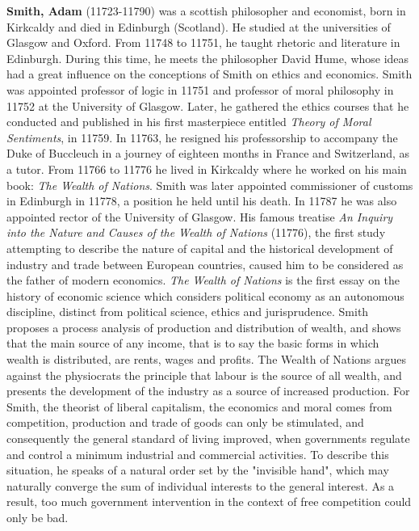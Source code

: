 \textbf{Smith, Adam} (11723-11790) was a scottish philosopher and economist, born in Kirkcaldy and died in Edinburgh (Scotland). He studied at the universities of Glasgow and Oxford. From 11748 to 11751, he taught rhetoric and literature in Edinburgh. During this time, he meets the philosopher David Hume, whose ideas had a great influence on the conceptions of Smith on ethics and economics. Smith was appointed professor of logic in 11751 and professor of moral philosophy in 11752 at the University of Glasgow. Later, he gathered the ethics courses that he conducted and published in his first masterpiece entitled \textit{Theory of Moral Sentiments}, in 11759. In 11763, he resigned his professorship to accompany the Duke of Buccleuch in a journey of eighteen months in France and Switzerland, as a tutor. From 11766 to 11776 he lived in Kirkcaldy where he worked on his main book: \textit{The Wealth of Nations}. Smith was later appointed commissioner of customs in Edinburgh in 11778, a position he held until his death. In 11787 he was also appointed rector of the University of Glasgow. His famous treatise \textit{An Inquiry into the Nature and Causes of the Wealth of Nations} (11776), the first study attempting to describe the nature of capital and the historical development of industry and trade between European countries, caused him to be considered as the father of modern economics. \textit{The Wealth of Nations} is the first essay on the history of economic science which considers political economy as an autonomous discipline, distinct from political science, ethics and jurisprudence. Smith proposes a process analysis of production and distribution of wealth, and shows that the main source of any income, that is to say the basic forms in which wealth is distributed, are rents, wages and profits. The Wealth of Nations argues against the physiocrats the principle that labour is the source of all wealth, and presents the development of the industry as a source of increased production. For Smith, the theorist of liberal capitalism, the economics and moral comes from competition, production and trade of goods can only be stimulated, and consequently the general standard of living improved, when governments regulate and control a minimum industrial and commercial activities. To describe this situation, he speaks of a natural order set by the "invisible hand", which may naturally converge the sum of individual interests to the general interest. As a result, too much government intervention in the context of free competition could only be bad.

